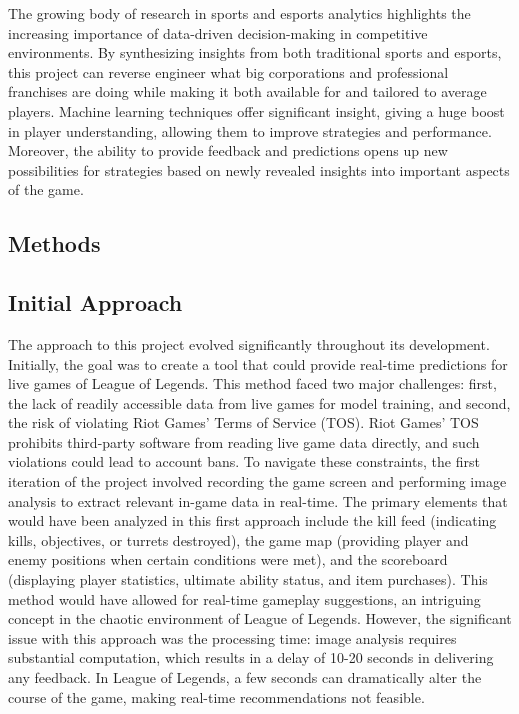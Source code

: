 \documentclass[10pt,twocolumn]{article}
\begin{document}
The growing body of research in sports and esports analytics highlights the increasing importance of data-driven decision-making in competitive environments. By synthesizing insights from both traditional sports and esports, this project can reverse engineer what big corporations and professional franchises are doing while making it both available for and tailored to average players. Machine learning techniques offer significant insight, giving a huge boost in player understanding, allowing them to improve strategies and performance. Moreover, the ability to provide feedback and predictions opens up new possibilities for strategies based on newly revealed insights into important aspects of the game.



\subsection{Methods}

\subsection{Initial Approach}
The approach to this project evolved significantly throughout its development. Initially, the goal was to create a tool that could provide real-time predictions for live games of League of Legends. This method faced two major challenges: first, the lack of readily accessible data from live games for model training, and second, the risk of violating Riot Games' Terms of Service (TOS). Riot Games’ TOS prohibits third-party software from reading live game data directly, and such violations could lead to account bans. To navigate these constraints, the first iteration of the project involved recording the game screen and performing image analysis\cite{van2014scikit} to extract relevant in-game data in real-time. The primary elements that would have been analyzed in this first approach include the kill feed (indicating kills, objectives, or turrets destroyed), the game map (providing player and enemy positions when certain conditions were met), and the scoreboard (displaying player statistics, ultimate ability status, and item purchases). This method would have allowed for real-time gameplay suggestions, an intriguing concept in the chaotic environment of League of Legends. However, the significant issue with this approach was the processing time: image analysis requires substantial computation, which results in a delay of 10-20 seconds in delivering any feedback. In League of Legends, a few seconds can dramatically alter the course of the game, making real-time recommendations not feasible. 
\end{document}
